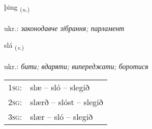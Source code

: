 \documentclass[frontgrid, backgrid]{flacards}\usepackage[]{graphicx}\usepackage[]{xcolor}
\begin{document}
\renewcommand{\flhead}{\vskip5pt \fboxsep=0pt {\small\bfseries\footnotesize Nafnorð | іменник}}
\renewcommand{\fcfoot}{\vskip5pt \fboxsep=0pt \hspace{2pt}{\small\bfseries\footnotesize 1K}}

\renewcommand{\blhead}{\vskip5pt {\small\bfseries\footnotesize Nafnorð | іменник }}
\renewcommand{\bcfoot}{\vskip5pt \hspace{2pt}{\small\bfseries\footnotesize 1K}}


{þing \small{\textsubscript{(\textit{n.})}} \\[1ex] %
\textphonetic{[θiŋk]} \\
ukr.: \emph{законодавче зібрання; парламент} \\  [2ex]
\renewcommand*{\arraystretch}{0.8}
}

\renewcommand{\flhead}{\vskip5pt \fboxsep=0pt {\small\bfseries\footnotesize Sagnorð | дієслово}}
\renewcommand{\fcfoot}{\vskip5pt \fboxsep=0pt \hspace{2pt}{\small\bfseries\footnotesize 1K}}

\renewcommand{\blhead}{\vskip5pt {\small\bfseries\footnotesize Sagnorð | дієслово }}
\renewcommand{\bcfoot}{\vskip5pt \hspace{2pt}{\small\bfseries\footnotesize 1K}}


{slá \small{\textsubscript{(\textit{v.})}} \\[1ex] %
\textphonetic{[stlauː]} \\
ukr.: \emph{бити; вдаряти; випереджати; боротися} \\  [2ex]
\renewcommand*{\arraystretch}{0.8}
\begin{tabular}{p{1cm}l}
\textsc{1sg}: & slæ -- sló -- slegið \\ 
\textsc{2sg}: & slærð -- slóst -- slegið \\ 
\textsc{3sg}: & slær -- sló -- slegið \\ 
\end{tabular}
}
\end{document}
